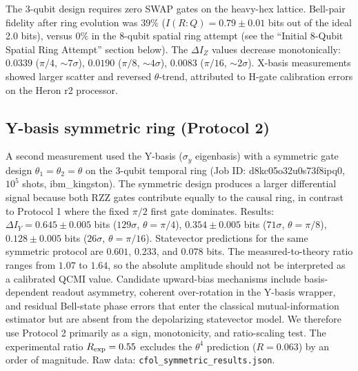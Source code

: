 \documentclass[aps,prl,superscriptaddress,nofootinbib]{revtex4-2}
\begin{document}
The 3-qubit design requires zero SWAP gates on the heavy-hex lattice. Bell-pair fidelity after ring evolution was $39\%$ ($I(R:Q)=0.79\pm0.01$ bits out of the ideal 2.0 bits), versus $0\%$ in the 8-qubit spatial ring attempt (see the ``Initial 8-Qubit Spatial Ring Attempt'' section below). The $\Delta I_Z$ values decrease monotonically: $0.0339$ ($\pi/4$, $\sim7\sigma$), $0.0190$ ($\pi/8$, $\sim4\sigma$), $0.0083$ ($\pi/16$, $\sim2\sigma$). X-basis measurements showed larger scatter and reversed $\theta$-trend, attributed to H-gate calibration errors on the Heron r2 processor.

\subsection{Y-basis symmetric ring (Protocol 2)}

A second measurement used the Y-basis ($\sigma_y$ eigenbasis) with a symmetric gate design $\theta_1=\theta_2=\theta$ on the 3-qubit temporal ring (Job ID: d8kc05o32u0s73f8ipq0, $10^5$ shots, ibm\_kingston). The symmetric design produces a larger differential signal because both RZZ gates contribute equally to the causal ring, in contrast to Protocol 1 where the fixed $\pi/2$ first gate dominates. Results: $\Delta I_Y = 0.645 \pm 0.005$ bits ($129\sigma$, $\theta=\pi/4$), $0.354 \pm 0.005$ bits ($71\sigma$, $\theta=\pi/8$), $0.128 \pm 0.005$ bits ($26\sigma$, $\theta=\pi/16$). Statevector predictions for the same symmetric protocol are $0.601$, $0.233$, and $0.078$ bits. The measured-to-theory ratio ranges from $1.07$ to $1.64$, so the absolute amplitude should not be interpreted as a calibrated QCMI value. Candidate upward-bias mechanisms include basis-dependent readout asymmetry, coherent over-rotation in the Y-basis wrapper, and residual Bell-state phase errors that enter the classical mutual-information estimator but are absent from the depolarizing statevector model. We therefore use Protocol 2 primarily as a sign, monotonicity, and ratio-scaling test. The experimental ratio $R_{\rm exp}=0.55$ excludes the $\theta^4$ prediction ($R=0.063$) by an order of magnitude. Raw data: \texttt{cfol\_symmetric\_results.json}.
\end{document}
